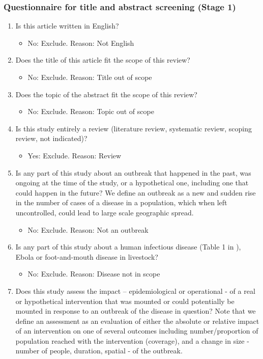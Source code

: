\documentclass[10pt,letterpaper]{article}
\begin{document}
\subsubsection*{Questionnaire for title and abstract screening (Stage 1)}
\begin{enumerate}
	\item	Is this article written in English?
	\begin{itemize}
		\item 	No: Exclude. Reason: Not English
	\end{itemize}
	\item 	Does the title of this article fit the scope of this review?
	\begin{itemize}
		\item 	No: Exclude. Reason: Title out of scope
	\end{itemize}
	\item	Does the topic of the abstract fit the scope of this review?
	\begin{itemize}
		\item 	No: Exclude. Reason: Topic out of scope
	\end{itemize}
	\item Is this study entirely a review (literature review, systematic review, scoping review, not indicated)? 
	\begin{itemize}
		\item 	Yes: Exclude. Reason: Review
	\end{itemize}
	\item Is any part of this study about an outbreak that happened in the past, was ongoing at the time of the study, or a hypothetical one, including one that could happen in the future? We define an outbreak as a new and sudden rise in the number of cases of a disease in a population, which when left uncontrolled, could lead to large scale geographic spread.
	\begin{itemize}
		\item 	No: Exclude. Reason: Not an outbreak
	\end{itemize}
	\item Is any part of this study about a human infectious disease (Table 1 in ), Ebola or foot-and-mouth disease in livestock?
	\begin{itemize}
		\item 	No: Exclude. Reason: Disease not in scope
	\end{itemize}
	\item Does this study assess the impact – epidemiological or operational - of a real or hypothetical intervention that was mounted or could potentially be mounted in response to an outbreak of the disease in question? Note that we define an assessment as an evaluation of either the absolute or relative impact of an intervention on one of several outcomes including number/proportion of population reached with the intervention (coverage), and a change in size - number of people, duration, spatial - of the outbreak.

\end{enumerate}
\end{document}
